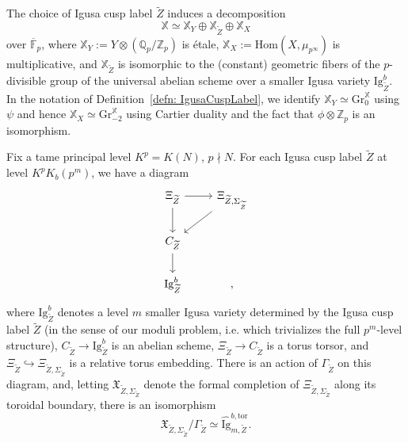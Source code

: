 \documentclass[letterpaper,11pt]{amsart}
\begin{document}
The choice of Igusa cusp label $\widetilde{Z}$ induces a decomposition 
\begin{equation}\label{eq:IgusaCuspLabelDecomposition}
\mathbb{X}\simeq \mathbb{X}_Y \oplus \mathbb{X}_{\widetilde{Z}} \oplus \mathbb{X}_X
\end{equation}
over $\overline{\mathbb{F}}_p$, where $\mathbb{X}_Y:=Y\otimes (\mathbb{Q}_p/\mathbb{Z}_p)$ is \'etale, $\mathbb{X}_X:=\mathrm{Hom}(X,\mu_{p^\infty})$ is multiplicative, and $\mathbb{X}_{\widetilde{Z}}$ is isomorphic to the (constant) geometric fibers of the $p$-divisible group of the universal abelian scheme over a smaller Igusa variety $\mathrm{Ig}^b_{\widetilde{Z}}$. In the notation of Definition~\ref{defn: IgusaCuspLabel}, we identify $\mathbb{X}_Y\simeq \mathrm{Gr}_0^{\mathbb{X}}$ using $\psi$ and hence $\mathbb{X}_X\simeq \mathrm{Gr}^{\mathbb{X}}_{-2}$ using Cartier duality and the fact that $\phi\otimes \mathbb{Z}_p$ is an isomorphism.

\begin{theorem}\label{thm:IgusaStratumDiagram}
   Fix a tame principal level $K^p=K(N)$, $p\nmid N$. For each Igusa cusp label $\widetilde{Z}$ at level $K^pK_b(p^m)$, we have a diagram 
   \begin{equation}\label{eq:IgusaStratumDiagram}
   \begin{tikzcd}
       \Xi_{\widetilde{Z}}\arrow[d]\arrow[r] & \Xi_{\widetilde{Z}, \Sigma_{\widetilde{Z}}}\arrow[dl] \\
       C_{\widetilde{Z}}\arrow[d] &  \\
       \mathrm{Ig}^b_{\widetilde{Z}} & ,
   \end{tikzcd}
   \end{equation}
   where $\mathrm{Ig}^b_{\widetilde{Z}}$ denotes a level $m$ smaller Igusa variety determined by the Igusa cusp label $\widetilde{Z}$ (in the sense of our moduli problem, i.e. which trivializes the full $p^m$-level structure), 
    $C_{\widetilde{Z}}\to \mathrm{Ig}^b_{\widetilde{Z}}$ is an abelian scheme, $\Xi_{\widetilde{Z}}\to C_{\widetilde{Z}}$ is a torus torsor, and $\Xi_{\widetilde{Z}} \hookrightarrow \Xi_{\widetilde{Z}, \Sigma_{\widetilde{Z}}}$ is a relative torus embedding. There is an action of $\Gamma_{\widetilde{Z}}$ on this diagram, and, letting $\mathfrak{X}_{\widetilde{Z}, \Sigma_{\widetilde{Z}}}$ denote the formal completion of $\Xi_{\widetilde{Z}, \Sigma_{\widetilde{Z}}}$ along its toroidal boundary, there is an isomorphism 
   \begin{equation}\label{eq:boundary chart iso}
   \mathfrak{X}_{\widetilde{Z}, \Sigma_{\widetilde{Z}}} / \Gamma_{\widetilde{Z}} \simeq \widehat{\mathrm{Ig}}^{b,\mathrm{tor}}_{m,\widetilde{Z}}.
   \end{equation}
\end{theorem}
\end{document}
